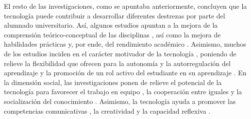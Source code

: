 El resto de las investigaciones, como se apuntaba anteriormente,
concluyen que la tecnología puede contribuir a desarrollar diferentes
destrezas por parte del alumnado universitario. Así, algunos estudios
apuntan a la mejora de la comprensión teórico-conceptual de las
disciplinas \cite{cruz2021,davila2023,martinez2021}, así como la mejora de habilidades prácticas \cite{maldonadotorres2021,perez2023} y, por ende, del rendimiento académico
\cite{diazramirez2023,higaldocajo2021}. Asimismo, muchos
de los estudios inciden en el carácter motivador de la tecnología
\cite{fernandez2023,fernandez2023b,rodrigo2022}, poniendo de relieve la flexibilidad que ofrecen
para la autonomía y la autorregulación del aprendizaje \cite{area2023,delacruz2021,quezadasarmiento2021} y
la promoción de un rol activo del estudiante en su aprendizaje
\cite{andrade2022,martinez2021}. En la
dimensión social, las investigaciones ponen de relieve el potencial de
la tecnología para favorecer el trabajo en equipo \cite{cordero2021,lagossanmartin2022,marques2023}, 
la
cooperación entre iguales \cite{collazo2023,martinez2021,lopeznoguero2023,rodrigo2022} y la socialización
del conocimiento \cite{gomez-gomez2021,ramos2022}. Asimismo, la
tecnología ayuda a promover las competencias comunicativas \cite{marques2023,fernandez2023,soncco2022}, la
creatividad \cite{cordero2021} y la capacidad reflexiva
\cite{marques2023,martinez2021}.
